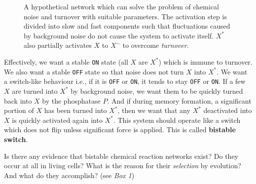 \documentclass[]{resonance}
\begin{document}
\begin{figure}[]
    \centering
    \caption{A hypothetical network which can solve the problem of chemical noise and
        turnover with suitable parameters. The activation step is divided
        into slow and fast components such that fluctuations caused by background
        noise do not cause the system to activate itself. $X^*$ also partially
        activates $X$ to $X^\sim$ to overcome \textit{turnover.}
    }\label{fig:model_bistable}
    \vspace{2mm}
\end{figure}

Effectively, we want a stable \texttt{ON} state (all $X$ are $X^*$) which is
immune to turnover. We also want a stable \texttt{OFF} state so that noise does
not turn $X$ into $X^*$.  We want a switch-like behaviour i.e., if it is
\texttt{OFF} or \texttt{ON}, it tends to stay \texttt{OFF} or \texttt{ON}. If a
few $X$ are turned into $X^*$ by background noise, we want them to be quickly
turned back into $X$ by the phosphatase $P$. And if during memory formation, a
significant portion of $X$ has been turned into $X^*$, then we want that any
$X^*$ deactivated into $X$ is quickly activated again into $X^*$. This system
should operate like a switch which does not flip unless significant force is
applied. This is called \textbf{bistable switch}.

Is there any evidence that bistable chemical reaction networks exist? Do they
occur at all in living cells?  What is the reason for their \emph{selection} by
evolution? And what do they accomplish? (see \textit{Box 1})
\end{document}
